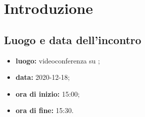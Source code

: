 \section*{Introduzione}

\subsection*{Luogo e data dell'incontro}
\begin{itemize}
	\item \textbf{luogo:} videoconferenza su ;
	\item \textbf{data:} 2020-12-18;
	\item \textbf{ora di inizio:} 15:00;
	\item \textbf{ora di fine:} 15:30.
\end{itemize}

